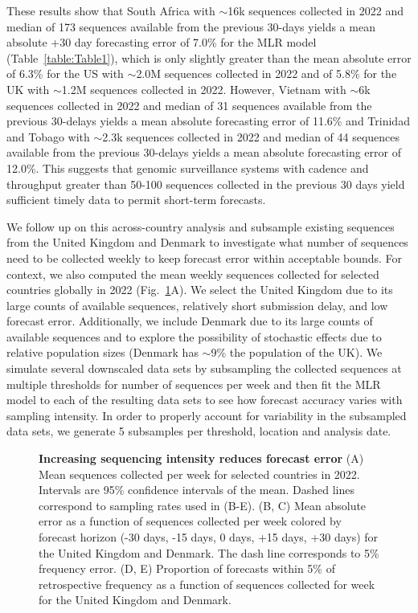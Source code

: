 \documentclass[10pt,letterpaper]{article}
\begin{document}
These results show that South Africa with $\sim$16k sequences collected in 2022 and median of 173 sequences available from the previous 30-days yields a mean absolute +30 day forecasting error of 7.0\% for the MLR model (Table~\ref{table:Table1}), which is only slightly greater than the mean absolute error of 6.3\% for the US with $\sim$2.0M sequences collected in 2022 and of 5.8\% for the UK with $\sim$1.2M sequences collected in 2022.
However, Vietnam with $\sim$6k sequences collected in 2022 and median of 31 sequences available from the previous 30-delays yields a mean absolute forecasting error of 11.6\% and Trinidad and Tobago with $\sim$2.3k sequences collected in 2022 and median of 44 sequences available from the previous 30-delays yields a mean absolute forecasting error of 12.0\%.
This suggests that genomic surveillance systems with cadence and throughput greater than 50-100 sequences collected in the previous 30 days yield sufficient timely data to permit short-term forecasts.


We follow up on this across-country analysis and subsample existing sequences from the United Kingdom and Denmark to investigate what number of sequences need to be collected weekly to keep forecast error within acceptable bounds.
For context, we also computed the mean weekly sequences collected for selected countries globally in 2022 (Fig.~\ref{fig:Fig6}A).
We select the United Kingdom due to its large counts of available sequences, relatively short submission delay, and low forecast error.
Additionally, we include Denmark due to its large counts of available sequences and to explore the possibility of stochastic effects due to relative population sizes (Denmark has $\sim$9\% the population of the UK).
We simulate several downscaled data sets by subsampling the collected sequences at multiple thresholds for number of sequences per week and then fit the MLR model to each of the resulting data sets to see how forecast accuracy varies with sampling intensity.
In order to properly account for variability in the subsampled data sets, we generate 5 subsamples per threshold, location and analysis date.


\begin{figure}[tb!]
    \centering
    \caption{
			\textbf{Increasing sequencing intensity reduces forecast error}
    	(A) Mean sequences collected per week for selected countries in 2022.
			Intervals are 95\% confidence intervals of the mean.
			Dashed lines correspond to sampling rates used in (B-E).
    	(B, C) Mean absolute error as a function of sequences collected per week colored by forecast horizon (-30 days, -15 days, 0 days, +15 days, +30 days) for the United Kingdom and Denmark.
			The dash line corresponds to 5\% frequency error.
    	(D, E) Proportion of forecasts within 5\% of retrospective frequency as a function of sequences collected for week for the United Kingdom and Denmark.
  	}
    \label{fig:Fig6}
\end{figure}
\end{document}
